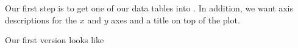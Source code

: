 Our first step is to get one of our data tables into \PGFPlots{}. In addition,
we want axis descriptions for the $x$ and $y$ axes and a title on top of the
plot.

Our first version looks like
%
\begin{codeexample}[]

%


%
\end{codeexample}

